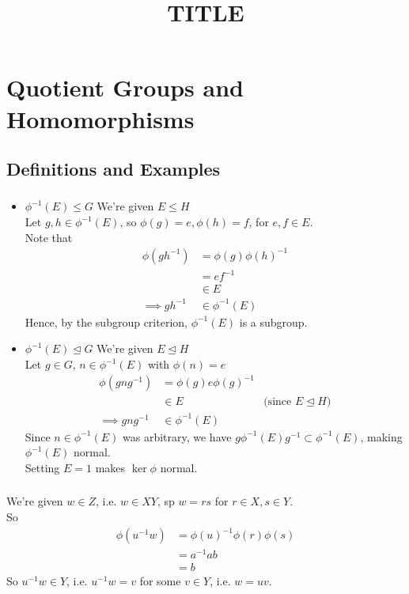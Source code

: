 \documentclass{article}
\title{TITLE}
\newcommand{\inv}[1]{ {#1}^{-1} }
\newcommand{\normal}{\unlhd}
\newcommand{\nml}{\normal}
\newcommand{\phiinv}{\phi^{-1}}
\begin{document}
\setcounter{tocdepth}{2}
\tableofcontents 
\setcounter{section}{2} 
\section{Quotient Groups and Homomorphisms}  

\subsection{Definitions and Examples}
\subsubsection{}\label{ex1p1}
\begin{itemize}
\item $\phiinv(E) \leq G$
We're given $E \leq H$\\
Let $g,h \in \phiinv(E)$, so $\phi(g)=e,\phi(h)=f$, for $e,f\in E$.\\
Note that
\begin{align*}
\phi(g\inv{h}) &= \phi(g)\phi(h)^{-1}\\
&= e\inv{f}\\
&\in E\\
\implies g\inv{h} &\in \phiinv(E)
\end{align*}
Hence, by the subgroup criterion, $\phiinv(E)$ is a subgroup.
\item $\phiinv(E) \nml G$
We're given $E \nml H$\\
Let $g\in G$, $n\in \phiinv(E)$ with $\phi(n) = e$\\
\begin{align*}
\phi(gn\inv{g}) &= \phi(g)e\phi(g)^{-1}\\
&\in E & \mbox{(since $E \nml H$)}\\
\implies gn\inv{g} &\in \phiinv(E)
\end{align*}
Since $n\in \phiinv(E)$ was arbitrary, we have $g\phiinv(E)\inv{g} \subset \phiinv(E)$, making $\phiinv(E)$ normal.\\
Setting $E=1$ makes $\ker\phi$ normal.
\end{itemize}
\subsubsection{}\label{ex1p2}
We're given $w \in Z$, i.e. $w \in XY$, sp $w=rs$ for $r\in X, s\in Y$.\\
So
\begin{align*}
\phi(\inv{u}w) &= \phi(u)^{-1}\phi(r)\phi(s)\\
&= \inv{a}ab\\
&= b
\end{align*}
So $\inv{u}w \in Y$, i.e. $\inv{u}w = v$ for some $v \in Y$, i.e. $w=uv$.
\end{document}
